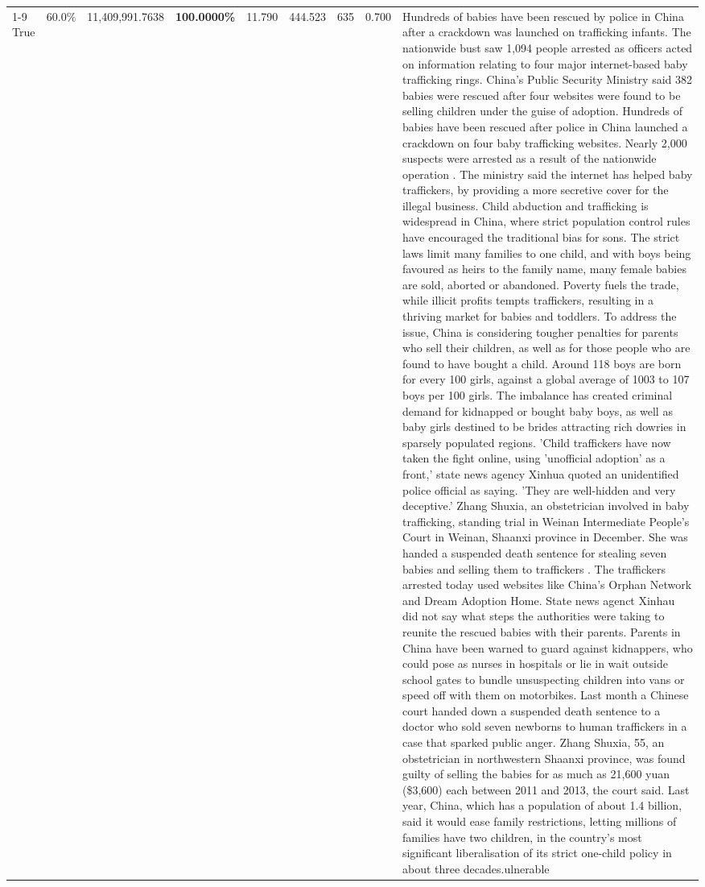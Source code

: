 \begin{table}[H]
\begin{tabular}{lllrlllll}
\cline{1-9}
True & 60.0\% & 11,409,991.7638 & \bfseries \color{red} 100.0000\% & 11.790 & 444.523 & 635 & 0.700 & Hundreds of babies have been rescued by police in China after a crackdown was launched on trafficking infants. The nationwide bust saw 1,094 people arrested as officers acted on information relating to four major internet-based baby trafficking rings. China's Public Security Ministry said 382 babies were rescued after four websites were found to be selling children under the guise of adoption. Hundreds of babies have been rescued after police in China launched a crackdown on four baby trafficking websites. Nearly 2,000 suspects were arrested as a result of the nationwide operation . The ministry said the internet has helped baby traffickers, by providing a more secretive cover for the illegal business. Child abduction and trafficking is widespread in China, where strict population control rules have encouraged the traditional bias for sons. The strict laws limit many families to one child, and with boys being favoured as heirs to the family name, many female babies are sold, aborted or abandoned. Poverty fuels the trade, while illicit profits tempts traffickers, resulting in a thriving market for babies and toddlers. To address the issue, China is considering tougher penalties for parents who sell their children, as well as for those people who are found to have bought a child. Around 118 boys are born for every 100 girls, against a global average of 1003 to 107 boys per 100 girls. The imbalance has created criminal demand for kidnapped or bought baby boys, as well as baby girls destined to be brides attracting rich dowries in sparsely populated regions. 'Child traffickers have now taken the fight online, using 'unofficial adoption' as a front,' state news agency Xinhua quoted an unidentified police official as saying. 'They are well-hidden and very deceptive.' Zhang Shuxia, an obstetrician involved in baby trafficking, standing trial in Weinan Intermediate People's Court in Weinan, Shaanxi province in December. She was handed a suspended death sentence for stealing seven babies and selling them to traffickers . The traffickers arrested today used websites like China's Orphan Network and Dream Adoption Home. State news agenct Xinhau did not say what steps the authorities were taking to reunite the rescued babies with their parents. Parents in China have been warned to guard against kidnappers, who could pose as nurses in hospitals or lie in wait outside school gates to bundle unsuspecting children into vans or speed off with them on motorbikes. Last month a Chinese court handed down a suspended death sentence to a doctor who sold seven newborns to human traffickers in a case that sparked public anger. Zhang Shuxia, 55, an obstetrician in northwestern Shaanxi province, was found guilty of selling the babies for as much as 21,600 yuan (\$3,600) each between 2011 and 2013, the court said. Last year, China, which has a population of about 1.4 billion, said it would ease family restrictions, letting millions of families have two children, in the country's most significant liberalisation of its strict one-child policy in about three decades.ulnerable \\

\end{tabular}
\end{table}
